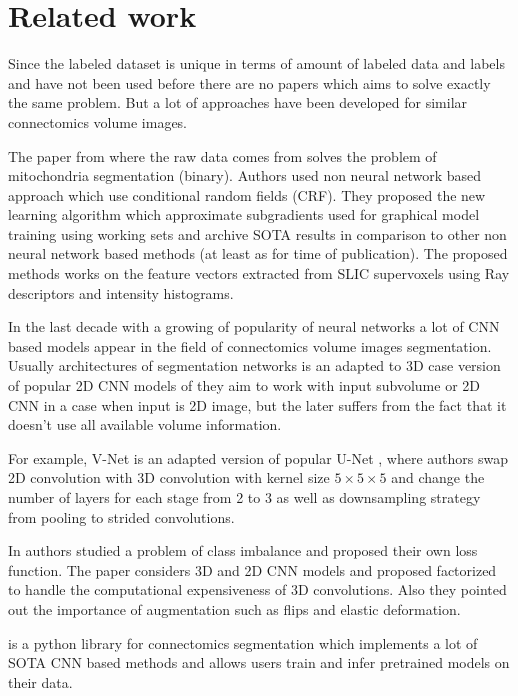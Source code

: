 \documentclass[twocolumn, a4paper]{article}
\theoremstyle{definition}
\begin{document}
\section{Related work}
Since the labeled dataset is unique in terms of amount of labeled data and labels
and have not been used before there are no papers which aims to solve exactly the same problem.
But a lot of approaches have been developed for similar connectomics volume images.

The paper \cite{lucchi2013learning} from where the raw data comes from solves the problem of mitochondria segmentation (binary).
Authors used non neural network based approach which use conditional random fields (CRF). They proposed
the new learning algorithm which approximate subgradients used for graphical model training using working sets and archive SOTA
results in comparison to other non neural network based methods (at least as for time of publication).
The proposed methods works on the feature vectors extracted from SLIC supervoxels \cite{achanta2012slic}
using Ray descriptors \cite{lucchi2011supervoxel} and intensity histograms.

In the last decade with a growing of popularity of neural networks a lot of CNN based
models appear in the field of connectomics volume images segmentation. Usually architectures of
segmentation networks is an adapted to 3D case version of popular 2D CNN models of they aim to work
with input subvolume or 2D CNN in a case when input is 2D image, but the later suffers from
the fact that it doesn't use all available volume information.

For example, V-Net \cite{milletari2016v}
is an adapted version of popular U-Net \cite{ronneberger2015u}, where authors swap 2D convolution with
3D convolution with kernel size \( 5 \times 5 \times 5 \) and change the number of layers for each stage from 2 to 3 as well as
downsampling strategy from pooling to strided convolutions.

In \cite{cheng2017volume} authors studied a problem of class imbalance and proposed their own loss function.
The paper considers 3D and 2D CNN models and proposed factorized to handle the computational expensiveness of 3D convolutions.
Also they pointed out the importance of augmentation such as flips and elastic deformation.

\cite{lin2021pytorch} is a python library for connectomics segmentation which implements a lot of
SOTA CNN based methods and allows users train and infer pretrained models on their data.
\end{document}
